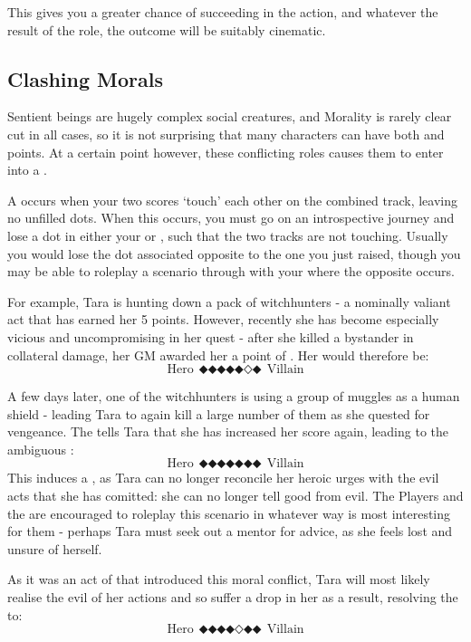 This gives you a greater chance of succeeding in the action, and whatever the result of the role, the outcome will be suitably cinematic. 

\subsection{Clashing Morals}

Sentient beings are hugely complex social creatures, and Morality is rarely clear cut in all cases, so it is not surprising that many characters can have both  and  points. At a certain point however, these conflicting roles causes them to enter into a . 

A  occurs when your two scores `touch' each other on the combined track, leaving no unfilled dots. When this occurs, you must go on an introspective journey and lose a dot in either your  or , such that the two tracks are not touching. Usually you would lose the dot associated opposite to the one you just raised, though you may be able to roleplay a scenario through with your  where the opposite occurs. 

For example, Tara is hunting down a pack of witchhunters - a nominally valiant act that has earned her 5  points. However, recently she has become especially vicious and uncompromising in her quest - after she killed a bystander in collateral damage, her GM awarded her a point of . Her  would therefore be:
$$ \text{Hero}~~\mdblkdiamond\mdblkdiamond\mdblkdiamond\mdblkdiamond\mdblkdiamond\mdwhtdiamond\mdblkdiamond~~\text{Villain}$$

A few days later, one of the witchhunters is using a group of muggles as a human shield - leading Tara to again kill a large number of them as she quested for vengeance. The  tells Tara that she has increased her  score again, leading to the ambiguous :
$$ \text{Hero}~~\mdblkdiamond\mdblkdiamond\mdblkdiamond\mdblkdiamond\mdblkdiamond\mdblkdiamond\mdblkdiamond~~\text{Villain}$$
This induces a , as Tara can no longer reconcile her heroic urges with the evil acts that she has comitted: she can no longer tell good from evil. The Players and the  are encouraged to roleplay this scenario in whatever way is most interesting for them - perhaps Tara must seek out a mentor for advice, as she feels lost and unsure of herself. 

As it was an act of  that introduced this moral conflict, Tara will most likely realise the evil of her actions and so suffer a drop in her  as a result, resolving the  to:
$$ \text{Hero}~~\mdblkdiamond\mdblkdiamond\mdblkdiamond\mdblkdiamond\mdwhtdiamond\mdblkdiamond\mdblkdiamond~~\text{Villain}$$

